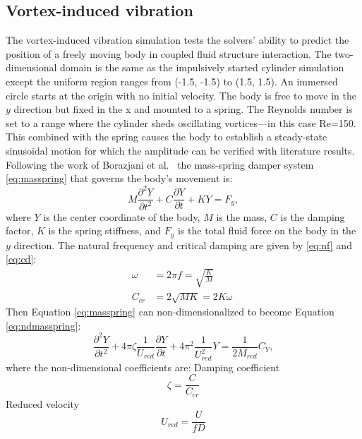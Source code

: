 \documentclass[preprint,12pt,5p]{elsarticle}
\begin{document}
\subsection{Vortex-induced vibration}
The vortex-induced vibration simulation tests the solvers' ability to predict the position of a freely moving body in coupled fluid structure interaction. 
The two-dimensional domain is the same as the impulsively started cylinder simulation except the uniform region ranges from (-1.5, -1.5) to (1.5, 1.5). 
An immersed circle starts at the origin with no initial velocity. 
The body is free to move in the $y$ direction but fixed in the x and mounted to a spring. 
The Reynolds number is set to a range where the cylinder sheds oscillating vortices---in this case Re=150. 
This combined with the spring causes the body to establish a steady-state sinusoidal motion for which the amplitude can be verified with literature results. 
Following the work of Borazjani et al.~\cite{borazjani2008curvilinear} the mass-spring damper system \eqref{eq:masspring} that governs the body's movement is:
\begin{equation}
M\frac{\partial^2Y}{\partial t^2}+C\frac{\partial Y}{\partial t}+KY=F_y, \label{eq:masspring}
\end{equation}
where $Y$ is the center coordinate of the body, $M$ is the mass, $C$ is the damping factor, $K$ is the spring stiffness, and $F_y$ is the total fluid force on the body in the $y$ direction. 
The natural frequency and critical damping are given by \eqref{eq:nf} and \eqref{eq:cd}: 
\begin{align}
\omega &=2\pi f =\sqrt{\frac{K}{M}}\label{eq:nf}\\
C_{cr}&=2\sqrt{MK}=2K\omega \; \label{eq:cd}
\end{align}
Then Equation \eqref{eq:masspring} can non-dimensionalized to become Equation \eqref{eq:ndmasspring}:
\begin{equation}
\frac{\partial^2 Y}{\partial t^2}+4\pi \zeta\frac{1}{U_{red}}\frac{\partial Y}{\partial t}+4\pi^2\frac{1}{U_{red}^2}Y=\frac{1}{2M_{red}}C_Y,\label{eq:ndmasspring}
\end{equation}
where the non-dimensional coefficients are:\newline
Damping coefficient
\begin{equation}
\zeta=\frac{C}{C_{cr}}\label{eq:damping coefficient}
\end{equation}
Reduced velocity
\begin{equation}
U_{red}=\frac{U}{fD}\label{eq:reduced velocity}
\end{equation}
\end{document}

